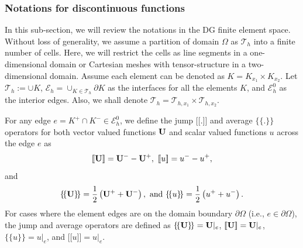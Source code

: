\documentclass[preprint,11pt]{elsarticle}
\newcommand{\bU}{{\bf U}}
\newcommand{\bn}{{\bf n}}
\def\ljump{{[\![}}
\def\rjump{{]\!]}}
\def\lavg{{\{\!\{}}
\def\ravg{{\}\!\}}}
\begin{document}
\subsubsection{Notations for discontinuous functions}
In this sub-section, we will review the notations in the DG finite element space. Without loss of generality, we assume a partition of domain $\Omega$ as $\mathcal{T}_h$ into a finite number of cells. Here, we will restrict the cells as line segments in a one-dimensional domain or Cartesian meshes with tensor-structure in a two-dimensional domain. Assume each element can be denoted as $K = K_{x_1}\times K_{x_2}$.
Let $\mathcal{T}_h:=\cup K$, $\mathcal{E}_h=\cup_{K\in\mathcal{T}_h} \partial K$ as the interfaces for all the elements $K$, and $\mathcal{E}_h^0$ as the interior edges. Also, we shall denote $\mathcal{T}_h = \mathcal{T}_{h,x_1}\times\mathcal{T}_{h,x_2}$. 

For any edge $e=K^+\cap K^-\in\mathcal{E}_h^0$, %
we define the jump $\ljump . \rjump$ and average $\lavg . \ravg$ operators for both vector valued functions $\bU$ and scalar valued functions $u$ across the edge $e$ as
%
\begin{eqnarray}
\ljump\bU\rjump = \bU^- - \bU^+,\
\ljump u \rjump=u^- - u^+,
\end{eqnarray}
%
and 
%
\begin{eqnarray}
\lavg\bU\ravg=\frac{1}{2}\left(\bU^++\bU^-\right),\text{ and }\lavg u\ravg=\frac{1}{2}\left(u^++u^-\right).
\end{eqnarray}
%
For cases where the element edges are on the domain boundary $\partial\Omega$ (i.e., $e\in\partial\Omega$), the jump and average operators are defined as $\lavg\bU\ravg = \bU|_e$, $\ljump\bU\rjump = \bU|_e$, $\lavg u \ravg = u|_e$, and $\ljump u\rjump = u|_e$. 
\end{document}
